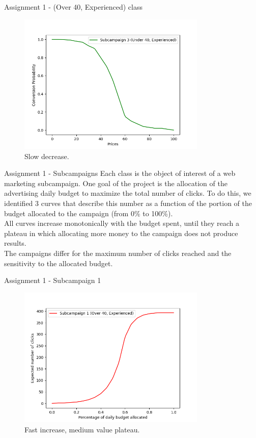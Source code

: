 \documentclass[11pt]{beamer}
\begin{document}
\begin{frame}{Assignment 1 - (Over 40, Experienced) class}
\begin{figure}[hbtp]
\centering
\includegraphics[width=0.8\textwidth]{images/demand_curve_3.png}
\caption{Slow decrease.}
\end{figure}
\end{frame}

\begin{frame}{Assignment 1 - Subcampaigns}
Each class is the object of interest of a web marketing subcampaign.
One goal of the project is the allocation of the advertising daily budget to maximize the total number of clicks. 
To do this, we identified 3 curves that describe this number as a function of the portion of the budget allocated to the campaign (from 0\% to 100\%).\\
All curves increase monotonically with the budget spent, until they reach a plateau in which allocating more money to the campaign does not produce results.\\
The campaigns differ for the maximum number of clicks reached and the sensitivity to the allocated budget.

\end{frame}

\begin{frame}{Assignment 1 - Subcampaign 1}
\begin{figure}[hbtp]
\centering
\includegraphics[width=0.8\textwidth]{images/subcampaign_1.png}
\caption{Fast increase, medium value plateau.}
\end{figure}
\end{frame}
\end{document}
